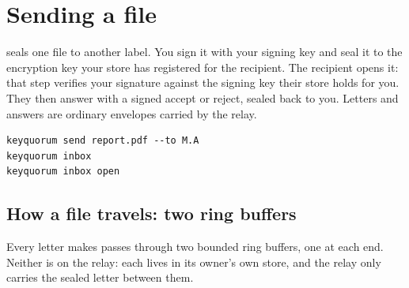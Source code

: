 \section{Sending a file}

 seals one file to another label. You sign it with your
signing key and seal it to the encryption key your store has registered for
the recipient. The recipient opens it: that step verifies your signature
against the signing key their store holds for you. They then answer with a
signed accept or reject, sealed back to you. Letters and answers are
ordinary  envelopes carried by the relay.

\begin{lstlisting}
keyquorum send report.pdf --to M.A
keyquorum inbox
keyquorum inbox open
\end{lstlisting}

\subsection{How a file travels: two ring buffers}
\label{sec:rings}

Every letter  makes passes through two bounded ring buffers, one at
each end. Neither is on the relay: each lives in its owner's own store, and the
relay only carries the sealed letter between them.

